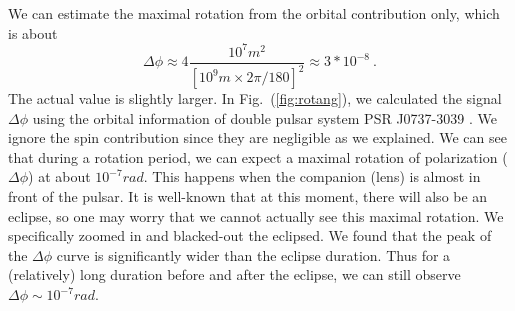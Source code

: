 \documentclass[aps,showpacs,twocolumn,floats,prd,superscriptaddress,nofootinbib]{revtex4}
\begin{document}
We can estimate the maximal rotation from the orbital contribution only, which is about\begin{equation}
\Delta\phi \approx 4 \frac{10^7 m^2}{\left[  10^9m\times  2\pi / 180 \right]^2}\approx 3*10^{-8}~.
\end{equation}
The actual value is slightly larger.
In Fig.~(\ref{fig:rotang}), we calculated the signal $\Delta \phi$ using the orbital information of double pulsar system PSR J0737-3039 \cite{KraSta97}. 
We ignore the spin contribution since they are negligible as we explained. 
We can see that during a rotation period, we can expect a maximal rotation of polarization ($\Delta\phi$) at about $10^{-7} rad$. 
This happens when the companion (lens) is almost in front of the pulsar.
It is well-known that at this moment, there will also be an eclipse, so one may worry that we cannot actually see this maximal rotation.
We specifically zoomed in and blacked-out the eclipsed.
We found that the peak of the $\Delta\phi$ curve is significantly wider than the eclipse duration.
Thus for a (relatively) long duration before and after the eclipse, we can still observe $\Delta\phi\sim10^{-7}rad$.





\end{document}
